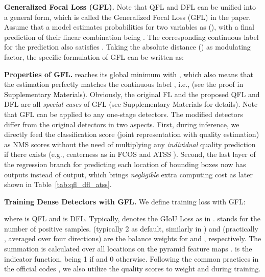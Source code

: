 \documentclass{article}
\begin{document}
\textbf{Generalized Focal Loss (GFL).} Note that QFL and DFL can be unified into a general form, which is called the Generalized Focal Loss (GFL) in the paper. Assume that a model estimates probabilities for two variables  as  (), with a final prediction of their linear combination being . The corresponding continuous label  for the prediction  also satisfies . Taking the absolute distance  () as modulating factor, the specific formulation of GFL can be written as:

\textbf{Properties of GFL.}  reaches its global minimum with , which also means that the estimation  perfectly matches the continuous label , i.e.,  (see the proof in \textcolor{black}{Supplementary Materials}). Obviously, the original FL \cite{lin2017focal} and the proposed QFL and DFL are all \emph{special cases} of GFL (see Supplementary Materials for details). Note that GFL can be applied to any one-stage detectors. The modified detectors differ from the original detectors in two aspects. First, during inference, we directly feed the classification score (joint representation with quality estimation) as NMS scores without the need of multiplying any \emph{individual} quality prediction if there exists (e.g., centerness as in FCOS \cite{tian2019fcos} and ATSS \cite{zhang2019bridging}). Second, the last layer of the regression branch for predicting each location of bounding boxes now has  outputs instead of  output, which brings \emph{negligible} extra computing cost as later shown in Table~\ref{tab:qfl_dfl_atss}. 
\iffalse

\fi


 









\textbf{Training Dense Detectors with GFL.}
We define training loss  with GFL:

where  is QFL and  is DFL. Typically,  denotes the GIoU Loss as in \cite{tian2019fcos,zhang2019bridging}.  stands for the number of positive samples.  (typically 2 as default, similarly in \cite{chen2019mmdetection}) and  (practically , averaged over four directions) are the balance weights for  and , respectively. The summation is calculated over all locations  on the pyramid feature maps \cite{lin2017feature}.  is the indicator function, being 1 if  and 0 otherwise. Following the common practices in the official codes \cite{chen2019mmdetection,tian2019fcos,zhang2019bridging,li2019learning}, we also utilize the quality scores to weight  and  during training. 
\end{document}
